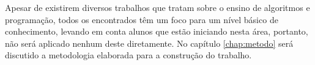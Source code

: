Apesar de existirem diversos trabalhos que tratam sobre o ensino de algoritmos e programação, todos os encontrados têm um foco para um nível básico de conhecimento, levando em conta alunos que estão iniciando nesta área, portanto, não será aplicado nenhum deste diretamente. No capítulo \ref{chap:metodo} será discutido a metodologia elaborada para a construção do trabalho.
 



